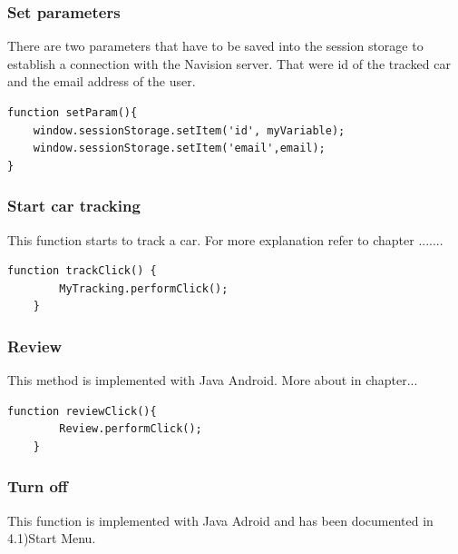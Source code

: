 \subsubsection{Set parameters}
There are two parameters that have to be saved into the session storage to establish a connection with the Navision server. That were id of the tracked car and the email address of the user.
\\
\begin{lstlisting}[language=html, caption= 
Set parameter function,captionpos=b]
function setParam(){
	window.sessionStorage.setItem('id', myVariable);
	window.sessionStorage.setItem('email',email);
}
\end{lstlisting}

\subsubsection{Start car tracking}
This function starts to track a car. For more explanation refer to chapter .......
\\

\begin{lstlisting}[language=html, caption= 
Car tracking function,captionpos=b]
function trackClick() {
        MyTracking.performClick();
    }
\end{lstlisting}

\subsubsection{Review}
This method is implemented with Java Android. More about in chapter...
\\

\begin{lstlisting}[language=html, caption= 
Review function,captionpos=b]
function reviewClick(){
        Review.performClick();
    }
\end{lstlisting}

\subsubsection{Turn off}
This function is implemented with Java Adroid and has been documented in 4.1)Start Menu.
\\

